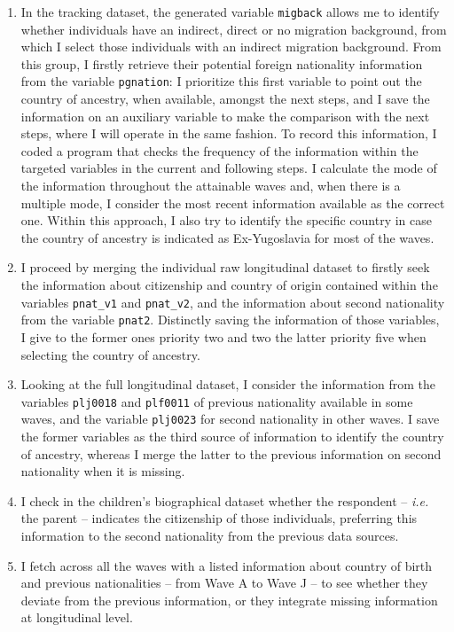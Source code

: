 \documentclass[12pt,a4paper]{article}
\begin{document}
\begin{enumerate}
     \item In the tracking dataset, the generated variable \texttt{migback} allows me to identify whether individuals have an indirect, direct or no migration background, from which I select those individuals with an indirect migration background. From this group, I firstly retrieve their potential foreign nationality information from the variable \texttt{pgnation}: I prioritize this first variable to point out the country of ancestry, when available, amongst the next steps, and I save the information on an auxiliary variable to make the comparison with the next steps, where I will operate in the same fashion. To record this information, I coded a program that checks the frequency of the information within the targeted variables in the current and following steps. I calculate the mode of the information throughout the attainable waves and, when there is a multiple mode, I consider the most recent information available as the correct one. Within this approach, I also try to identify the specific country in case the country of ancestry is indicated as Ex-Yugoslavia for most of the waves.
     \item I proceed by merging the individual raw longitudinal dataset to firstly seek the information about citizenship and country of origin contained within the variables \texttt{pnat\_v1} and \texttt{pnat\_v2}, and the information about second nationality from the variable \texttt{pnat2}. Distinctly saving the information of those variables, I give to the former ones priority two and two the latter priority five when selecting the country of ancestry.
     \item Looking at the full longitudinal dataset, I consider the information from the variables \texttt{plj0018} and \texttt{plf0011} of previous nationality available in some waves, and the variable \texttt{plj0023} for second nationality in other waves. I save the former variables as the third source of information to identify the country of ancestry, whereas I merge the latter to the previous information on second nationality when it is missing.
     \item I check in the children's biographical dataset whether the respondent -- \textit{i.e.} the parent -- indicates the citizenship of those individuals, preferring this information to the second nationality from the previous data sources.
     \item I fetch across all the waves with a listed information about country of birth and previous nationalities -- from Wave A to Wave J -- to see whether they deviate from the previous information, or they integrate missing information at longitudinal level.

\end{enumerate}
\end{document}
